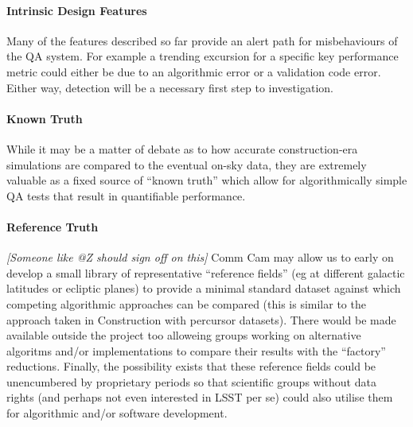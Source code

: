 \paragraph{Intrinsic Design Features}

Many of the features described so far provide an alert path for misbehaviours of the QA system. For example a trending excursion for a specific key performance metric could either be due to an algorithmic error or a validation code error. Either way, detection will be a necessary first step to investigation.

\paragraph{Known Truth}

While it may be a matter of debate as to how accurate construction-era simulations are compared to the eventual on-sky data, they are extremely valuable as a fixed source of ``known truth'' which allow for algorithmically simple QA tests that result in quantifiable performance.

\paragraph{Reference Truth}

\emph{[Someone like @Z should sign off on this]} Comm Cam may allow us to early on develop a small library of representative ``reference fields'' (eg at different galactic latitudes or ecliptic planes) to provide a minimal standard dataset against which competing algorithmic approaches can be compared (this is similar to the approach taken in Construction with percursor datasets). There would be made available outside the project too alloweing groups working on alternative algoritms and/or implementations to compare their results with the ``factory'' reductions. Finally, the possibility exists that these reference fields could be unencumbered by proprietary periods so that scientific groups without data rights (and perhaps not even interested in LSST per se) could also utilise them for algorithmic and/or software development.
